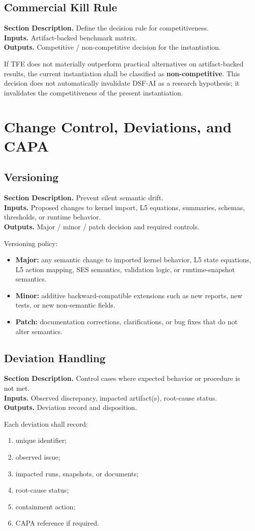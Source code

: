 \documentclass[11pt]{report}
\newcommand{\meta}[3]{\textbf{Section Description.} #1\\
\textbf{Inputs.} #2\\
\textbf{Outputs.} #3\par}
\begin{document}
\section{Commercial Kill Rule}
\meta{Define the decision rule for competitiveness.}{Artifact-backed benchmark matrix.}{Competitive / non-competitive decision for the instantiation.}

If TFE does not materially outperform practical alternatives on artifact-backed results, the current instantiation shall be classified as \textbf{non-competitive}. This decision does not automatically invalidate DSF-AI as a research hypothesis; it invalidates the competitiveness of the present instantiation.
\chapter{Change Control, Deviations, and CAPA}
\section{Versioning}
\meta{Prevent silent semantic drift.}{Proposed changes to kernel import, L5 equations, summaries, schemas, thresholds, or runtime behavior.}{Major / minor / patch decision and required controls.}

Versioning policy:
\begin{itemize}
    \item \textbf{Major:} any semantic change to imported kernel behavior, L5 state equations, L5 action mapping, SES semantics, validation logic, or runtime-snapshot semantics.
    \item \textbf{Minor:} additive backward-compatible extensions such as new reports, new tests, or new non-semantic fields.
    \item \textbf{Patch:} documentation corrections, clarifications, or bug fixes that do not alter semantics.
\end{itemize}

\section{Deviation Handling}
\meta{Control cases where expected behavior or procedure is not met.}{Observed discrepancy, impacted artifact(s), root-cause status.}{Deviation record and disposition.}

Each deviation shall record:
\begin{enumerate}[leftmargin=1.2cm]
    \item unique identifier;
    \item observed issue;
    \item impacted runs, snapshots, or documents;
    \item root-cause status;
    \item containment action;
    \item CAPA reference if required.
\end{enumerate}
\end{document}
